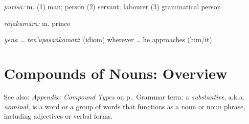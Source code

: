 \documentclass[11pt,oneside]{memoir}
\begin{document}
\emph{purisa:} m. (1) man; person (2) servant; labourer (3) grammatical person

\emph{rājakumāra:} m. prince

\emph{yena \ldots{} ten'upasaṅkamati}: (idiom) wherever \ldots{} he approaches (him/it)

\clearpage
\section{Compounds of Nouns: Overview}
\label{sec:org11785e4}

\label{compounds-overview}

{\footnotesize
See also: \emph{Appendix: Compound Types} on p.\pageref{compound-types}. Grammar
term: a \emph{substantive}, a.k.a. \emph{nominal}, is a word or a group of words that
functions as a noun or noun phrase, including adjectives or verbal forms.
}
\end{document}
